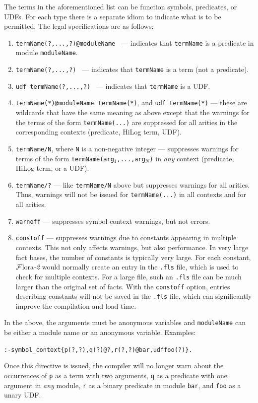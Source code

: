 \documentclass[11pt]{article}
\newcommand{\FLSYSTEM}{{\mbox{\sc ${\cal F}${lora}\rm\emph{-2}}}\xspace}
\begin{document}
The terms in the aforementioned list can be function symbols, predicates,
or UDFs. For each type there is a separate idiom to indicate what is to be
permitted.
The legal specifications are as follows:
\begin{enumerate}
\item {\tt termName(?,...,?)@moduleName } --- indicates that
  \texttt{termName} is a predicate in module \texttt{moduleName}.  
\item {\tt termName(?,...,?) } --- indicates that \texttt{termName} is a
  term (not a predicate).
\item {\tt udf termName(?,...,?) } --- indicates that \texttt{termName}
  is a UDF.
\item \texttt{termName(*)@moduleName}, \texttt{termName(*)}, and \texttt{udf
    termName(*)} --- these are wildcards that have the same meaning as
  above except that the warnings for the terms of the form
  \texttt{termName(...)}  are suppressed for all arities in the
  corresponding contexts (predicate, HiLog term, UDF).
\item \texttt{termName/N}, where \texttt{N} is a non-negative integer ---
  suppresses warnings for terms of the form
  \texttt{termName(arg$_1$,...,arg$_N$)} in \emph{any} context (predicate,
  HiLog term, or a UDF).
\item \texttt{termName/?} --- like \texttt{termName/N} above but suppresses
  warnings for all arities. Thus, warnings will not be issued for
  \texttt{termName(...)} in all contexts and for all arities.
\item \texttt{warnoff} --- suppresses symbol context warnings, but not errors.
\item \texttt{constoff} --- suppresses warnings due to constants appearing
  in multiple contexts. This not only affects warnings, but also performance.
  In very large fact bases, the number of constants is typically very large.
  For each constant, \FLSYSTEM would normally create an entry in the
  \texttt{.fls} file, which is used to check for multiple contexts.
  For a large file, such an \texttt{.fls} file can be much larger than the
  original set of facts. 
  With the \texttt{constoff} option, entries describing constants  will not be
  saved in the \texttt{.fls} file, which can significantly improve the
  compilation and load time. 
\end{enumerate}
In the above, the arguments must be anonymous variables
and \texttt{moduleName} can be either a module name or an anonymous variable.
Examples:
\begin{alltt}
    :- symbol_context\{p(?,?), q(?)@?, r(?,?)@bar, udf foo(?)\}.
\end{alltt}
Once this directive is issued, the compiler will no longer warn about the
occurrences of \texttt{p} as a term with two arguments, \texttt{q} as a
predicate with one argument in \emph{any} module, \texttt{r} as a binary
predicate in module \texttt{bar}, and \texttt{foo} as a unary UDF.      
\end{document}
